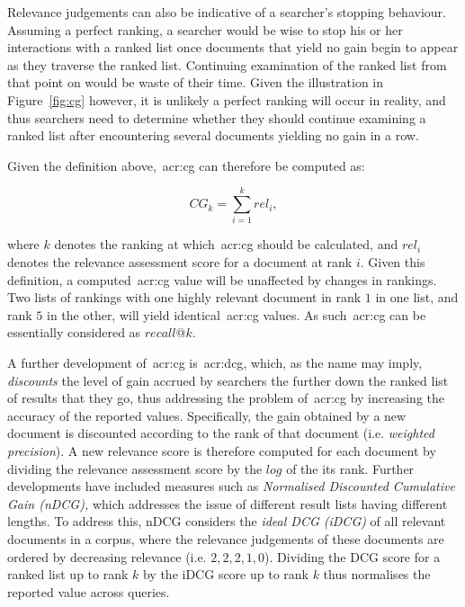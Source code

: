 Relevance judgements can also be indicative of a searcher's stopping behaviour. Assuming a perfect ranking, a searcher would be wise to stop his or her interactions with a ranked list once documents that yield no gain begin to appear as they traverse the ranked list. Continuing examination of the ranked list from that point on would be waste of their time. Given the illustration in Figure~\ref{fig:cg} however, it is unlikely a perfect ranking will occur in reality, and thus searchers need to determine whether they should continue examining a ranked list after encountering several documents yielding no gain in a row.

Given the definition above,~\gls{acr:cg} can therefore be computed as:

\begin{equation*}
    CG_k = \sum_{i=1}^{k} rel_i,
\end{equation*}

where $k$ denotes the ranking at which~\gls{acr:cg} should be calculated, and $rel_i$ denotes the relevance assessment score for a document at rank $i$. Given this definition, a computed~\gls{acr:cg} value will be unaffected by changes in rankings. Two lists of rankings with one highly relevant document in rank $1$ in one list, and rank $5$ in the other, will yield identical~\gls{acr:cg} values. As such~\gls{acr:cg} can be essentially considered as $recall@k$.

A further development of~\gls{acr:cg} is~\gls{acr:dcg}, which, as the name may imply, \emph{discounts} the level of gain accrued by searchers the further down the ranked list of results that they go, thus addressing the problem of~\gls{acr:cg} by increasing the accuracy of the reported values. Specifically, the gain obtained by a new document is discounted according to the rank of that document (i.e. \emph{weighted precision}). A new relevance score is therefore computed for each document by dividing the relevance assessment score by the $log$ of the its rank. Further developments have included measures such as \emph{Normalised Discounted Cumulative Gain (nDCG),} which addresses the issue of different result lists having different lengths. To address this, nDCG considers the \emph{ideal DCG (iDCG)} of all relevant documents in a corpus, where the relevance judgements of these documents are ordered by decreasing relevance (i.e. $2,2,2,1,0$). Dividing the DCG score for a ranked list up to rank $k$ by the iDCG score up to rank $k$ thus normalises the reported value across queries.

